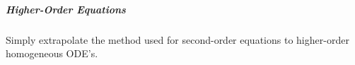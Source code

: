 \documentclass[11pt]{article}
\begin{document}
		\subparagraph{Higher-Order Equations} Simply extrapolate the method used for second-order equations to higher-order homogeneous ODE's.
	

%		
%		


\end{document}
